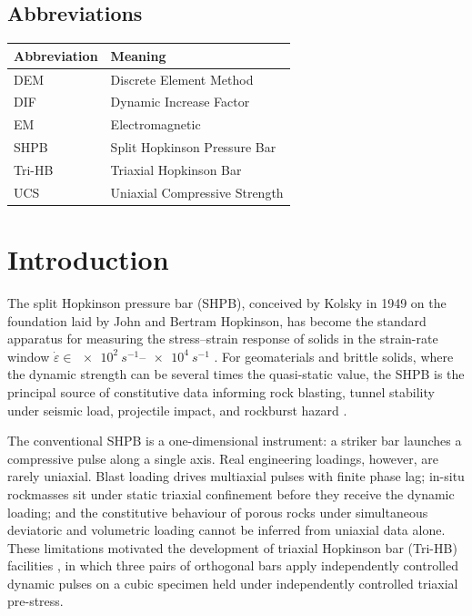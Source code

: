 \documentclass[11pt,a4paper,openany]{book}
\providecommand{\SIrange}[3]{\qtyrange{#1}{#2}{#3}}
\theoremstyle{handbook}
\newcommand{\eps}{\varepsilon}
\newcommand{\epsdot}{\dot\eps}
\begin{document}
\section*{Abbreviations}
\begin{longtable}{@{}p{3cm}p{12cm}@{}}
\toprule
\textbf{Abbreviation} & \textbf{Meaning} \\
\midrule
\endhead
DEM & Discrete Element Method \\
DIF & Dynamic Increase Factor \\
EM & Electromagnetic \\
SHPB & Split Hopkinson Pressure Bar \\
Tri-HB & Triaxial Hopkinson Bar \\
UCS & Uniaxial Compressive Strength \\
\bottomrule
\end{longtable}


\mainmatter

\chapter{Introduction}\label{ch:intro}

The split Hopkinson pressure bar (SHPB), conceived by Kolsky in 1949
\cite{Kolsky1949} on the foundation laid by John and Bertram Hopkinson, has
become the standard apparatus for measuring the stress--strain response of
solids in the strain-rate window
$\epsdot \in \SIrange{e2}{e4}{s^{-1}}$ \cite{Lindholm1964,FollansbeeFrantz1983}.
For geomaterials and brittle solids, where the dynamic strength can be several
times the quasi-static value, the SHPB is the principal source of
constitutive data informing rock blasting, tunnel stability under seismic load,
projectile impact, and rockburst hazard \cite{ZhangZhao2014,WangZhang2026}.

The conventional SHPB is a one-dimensional instrument: a striker bar launches
a compressive pulse along a single axis. Real engineering loadings, however,
are rarely uniaxial. Blast loading drives multiaxial pulses with finite
phase lag; in-situ rockmasses sit under static triaxial confinement before
they receive the dynamic loading; and the constitutive behaviour of porous
rocks under simultaneous deviatoric and volumetric loading cannot be inferred
from uniaxial data alone. These limitations motivated the development of
triaxial Hopkinson bar (Tri-HB) facilities \cite{Liu2019,Zhang2019Tri},
in which three pairs of orthogonal bars apply independently controlled dynamic
pulses on a cubic specimen held under independently controlled triaxial
pre-stress.
\end{document}
